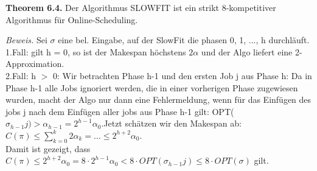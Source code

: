 \textbf{Theorem 6.4.} Der Algorithmus SLOWFIT ist ein strikt 8-kompetitiver Algorithmus für Online-Scheduling.

\textit{Beweis.} Sei $\sigma$ eine bel. Eingabe, auf der SlowFit die phasen 0, 1, ..., h durchläuft.\\
1.Fall: gilt h = 0, so ist der Makespan höchstens $2\alpha$ und der Algo liefert eine 2-Approximation.\\
2.Fall: h $>$ 0: Wir betrachten Phase h-1 und den ersten Job j aus Phase h: Da in Phase h-1 alle Jobs ignoriert werden, die in einer vorherigen Phase zugewiesen wurden, macht der Algo nur dann eine Fehlermeldung, wenn für das Einfügen des jobs j nach dem Einfügen aller jobs aus Phase h-1 gilt: OPT($\sigma_{h-1}j) > \alpha_{h-1} = 2^{h-1}\alpha_{0}$.Jetzt schätzen wir den Makespan ab: $C(\pi) \le \sum_{k=0}^{k}2\alpha_{k} = ... \le 2^{h+2}\alpha_{0}$.\\
Damit ist gezeigt, dass $C(\pi) \le 2^{h+2}\alpha_{0} = 8 \cdot 2^{h-1} \alpha_{0} < 8 \cdot OPT(\sigma_{h-1}j) \le 8 \cdot OPT(\sigma)$ gilt.
